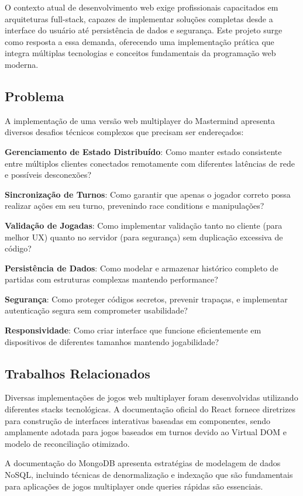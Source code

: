 \documentclass[conference]{IEEEtran}
\begin{document}
O contexto atual de desenvolvimento web exige profissionais capacitados em arquiteturas full-stack, capazes de implementar soluções completas desde a interface do usuário até persistência de dados e segurança. Este projeto surge como resposta a essa demanda, oferecendo uma implementação prática que integra múltiplas tecnologias e conceitos fundamentais da programação web moderna.

\subsection{Problema}
A implementação de uma versão web multiplayer do Mastermind apresenta diversos desafios técnicos complexos que precisam ser endereçados:

\textbf{Gerenciamento de Estado Distribuído}: Como manter estado consistente entre múltiplos clientes conectados remotamente com diferentes latências de rede e possíveis desconexões?

\textbf{Sincronização de Turnos}: Como garantir que apenas o jogador correto possa realizar ações em seu turno, prevenindo race conditions e manipulações?

\textbf{Validação de Jogadas}: Como implementar validação tanto no cliente (para melhor UX) quanto no servidor (para segurança) sem duplicação excessiva de código?

\textbf{Persistência de Dados}: Como modelar e armazenar histórico completo de partidas com estruturas complexas mantendo performance?

\textbf{Segurança}: Como proteger códigos secretos, prevenir trapaças, e implementar autenticação segura sem comprometer usabilidade?

\textbf{Responsividade}: Como criar interface que funcione eficientemente em dispositivos de diferentes tamanhos mantendo jogabilidade?

\subsection{Trabalhos Relacionados}
Diversas implementações de jogos web multiplayer foram desenvolvidas utilizando diferentes stacks tecnológicas. A documentação oficial do React \cite{react:2024} fornece diretrizes para construção de interfaces interativas baseadas em componentes, sendo amplamente adotada para jogos baseados em turnos devido ao Virtual DOM e modelo de reconciliação otimizado.

A documentação do MongoDB \cite{mongodb:2024} apresenta estratégias de modelagem de dados NoSQL, incluindo técnicas de denormalização e indexação que são fundamentais para aplicações de jogos multiplayer onde queries rápidas são essenciais.
\end{document}
